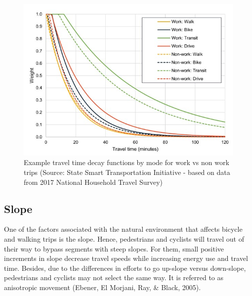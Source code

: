 \documentclass[
11pt, %
oneside, %
english, %
singlespacing, %
]{macthesis} %
\begin{document}
\begin{figure}

{\centering \includegraphics[width=0.5\linewidth]{figure/ch02-Fig-02} 

}

\caption{Example travel time decay functions by mode for work vs non work trips (Source: State Smart Transportation Initiative - based on data from 2017 National Household Travel Survey)}\label{fig:ch02-plot-fig-02}
\end{figure}

\subsection{Slope}\label{slope}

One of the factors associated with the natural environment that affects bicycle and walking trips is the slope. Hence, pedestrians and cyclists will travel out of their way to bypass segments with steep slopes. For them, small positive increments in slope decrease travel speeds while increasing energy use and travel time. Besides, due to the differences in efforts to go up-slope versus down-slope, pedestrians and cyclists may not select the same way. It is referred to as anisotropic movement (Ebener, El Morjani, Ray, \& Black, 2005).
\end{document}
